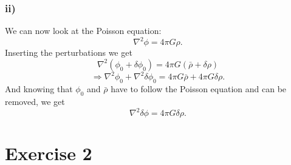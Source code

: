 \documentclass[a4paper,norsk, 10pt]{article}
\begin{document}
\subsubsection{ii)}
We can now look at the Poisson equation:
\begin{equation}
\nabla^2 \phi = 4\pi G\rho.
\end{equation}
Inserting the perturbations we get
\begin{equation}
\nabla^2 (\phi_0 + \delta \phi_0) = 4\pi G(\bar{\rho} + \delta \rho)
\end{equation}
\begin{equation}
\Rightarrow \nabla^2 \phi_0 + \nabla^2\delta \phi_0 = 4\pi G\bar{\rho} + 4\pi G\delta \rho.
\end{equation}
And knowing that $\phi_0$ and $\bar{\rho}$ have to follow the Poisson equation and can be removed, we get
\begin{equation}
\nabla^2 \delta\phi = 4\pi G \delta\rho.
\end{equation}



\section{Exercise 2}
\end{document}

